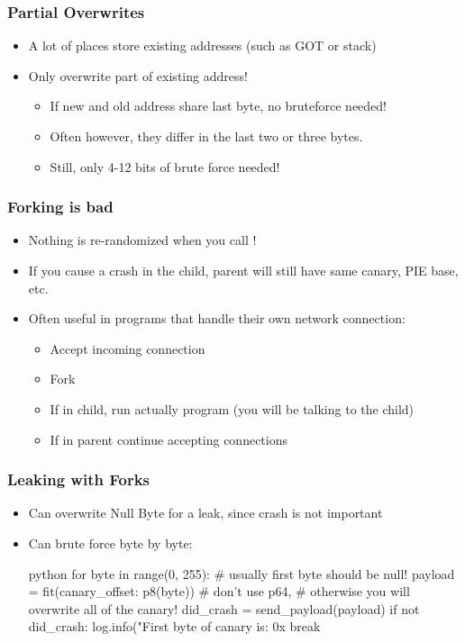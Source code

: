\documentclass[aspectratio=169]{beamer}
\begin{document}
{\begin{frame}
    \frametitle{Partial Overwrites}
    \begin{itemize}
        \item A lot of places store existing addresses (such as GOT or stack)
        \item Only overwrite part of existing address!
        \begin{itemize}
            \item If new and old address share last byte, no bruteforce needed!
            \item Often however, they differ in the last two or three bytes.
            \item Still, only 4-12 bits of brute force needed!
        \end{itemize}
    \end{itemize}

\end{frame}

\begin{frame}[fragile]
    \frametitle{Forking is bad}
    \begin{itemize}
        \item Nothing is re-randomized when you call !
        \item If you cause a crash in the child, parent will still have same canary, PIE base, etc.
        \item Often useful in programs that handle their own network connection:
        \begin{itemize}
            \item Accept incoming connection
            \item Fork
            \item If in child, run actually program (you will be talking to the child)
            \item If in parent continue accepting connections
        \end{itemize}
    \end{itemize}
\end{frame}

\begin{frame}[fragile]
    \frametitle{Leaking with Forks}
    \begin{itemize}
        \item Can overwrite Null Byte for a leak, since crash is not important
        \item Can brute force byte by byte:
        \begin{codebox}{python}
for byte in range(0, 255): # usually first byte should be null!
    payload = fit(canary_offset: p8(byte)) # don't use p64,
            # otherwise you will overwrite all of the canary!
    did_crash = send_payload(payload)
    if not did_crash:
        log.info("First byte of canary is: 0x%
        break\end{codebox}
    \end{itemize}
\end{frame}

}
\end{document}
